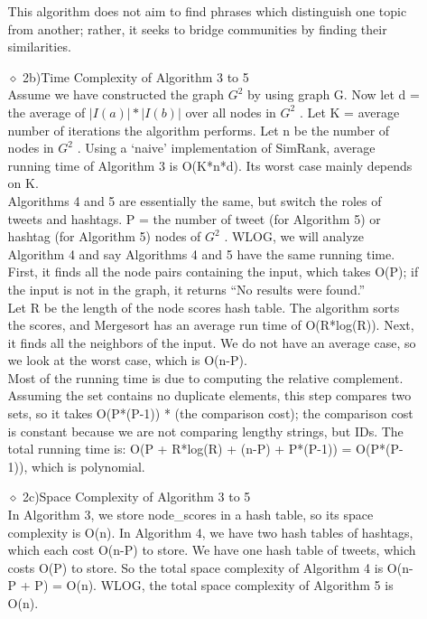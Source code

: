 \documentclass[10pt]{article}
\begin{document}
\begin{itemize}
\begin{itemize}
This algorithm does not aim to find phrases which distinguish one topic from another; rather, it seeks to bridge communities by finding their similarities. \\

\item[$\diamond$]{2b)Time Complexity of Algorithm 3 to 5}\\

Assume we have constructed the graph $ G^2$  by using graph G. Now let d = the average of $|I(a)|*|I(b)|$ over all nodes in $ G^2$ . Let K = average number of iterations the algorithm performs. Let n be the number of nodes in $ G^2$ . Using a ‘naive’ implementation of SimRank, average running time of Algorithm 3 is O(K*n*d). Its worst case mainly depends on K. \\

Algorithms 4 and 5 are essentially the same, but switch the roles of tweets and hashtags. P = the number of tweet (for Algorithm 5) or hashtag (for Algorithm 5) nodes of $ G^2$ . WLOG, we will analyze Algorithm 4 and say Algorithms 4 and 5 have the same running time. First, it finds all the node pairs containing the input, which takes O(P); if the input is not in the graph, it returns “No results were found.” \\

Let R be the length of the node scores hash table. The algorithm sorts the scores, and Mergesort has an average run time of O(R*log(R)). Next, it finds all the neighbors of the input. We do not have an average case, so we look at the worst case, which is O(n-P). \\

Most of the running time is due to computing the relative complement. Assuming the set contains no duplicate elements, this step compares two sets, so it takes O(P*(P-1)) * (the comparison cost); the comparison cost is constant because we are not comparing lengthy strings, but IDs. The total running time is:
O(P + R*log(R) + (n-P) + P*(P-1)) = O(P*(P-1)), which is polynomial.  \\

\item[$\diamond$]{2c)Space Complexity of Algorithm 3 to 5}\\

In Algorithm 3, we store node\_scores in a hash table, so its space complexity  is O(n). In Algorithm 4, we have two hash tables of hashtags, which each cost O(n-P) to store. We have one hash table of tweets, which costs O(P) to store. So the total space complexity of Algorithm 4 is O(n-P + P) = O(n). WLOG, the total space complexity of Algorithm 5 is O(n). \\\\\\\\


\end{itemize}
\end{itemize}
\end{document}

